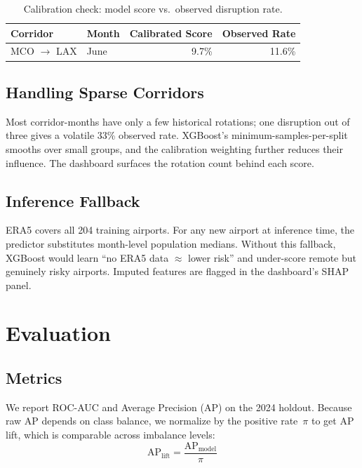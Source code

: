 \documentclass[11pt, twoside]{article}
\begin{document}
\begin{table}[H]
\centering
\caption{Calibration check: model score vs.\ observed disruption rate.}
\label{tab:calib_validation}
\begin{tabular}{llrr}
\toprule
Corridor & Month & Calibrated Score & Observed Rate \\
\midrule
MCO $\to$ LAX & June & 9.7\% & 11.6\% \\
\bottomrule
\end{tabular}
\end{table}

\subsection{Handling Sparse Corridors}

Most corridor-months have only a few historical rotations; one disruption out
of three gives a volatile 33\% observed rate.  XGBoost's minimum-samples-per-split
smooths over small groups, and the calibration weighting further reduces their
influence.  The dashboard surfaces the rotation count behind each score.

\subsection{Inference Fallback}

ERA5 covers all 204 training airports.  For any new airport at inference time,
the predictor substitutes month-level population medians.  Without this fallback,
XGBoost would learn ``no ERA5 data $\approx$ lower risk'' and under-score
remote but genuinely risky airports.  Imputed features are flagged in the
dashboard's SHAP panel.


\clearpage
\section{Evaluation}
\label{sec:eval}

\subsection{Metrics}

We report ROC-AUC and Average Precision (AP) on the 2024 holdout.  Because
raw AP depends on class balance, we normalize by the positive rate~$\pi$ to
get AP lift, which is comparable across imbalance levels:
\begin{equation}
  \mathrm{AP}_{\text{lift}} = \frac{\mathrm{AP}_{\text{model}}}{\pi}
\end{equation}
\end{document}
